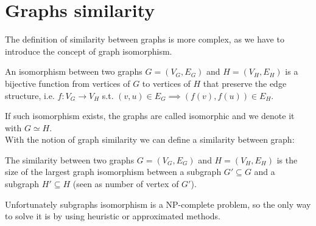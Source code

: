 \section{Graphs similarity}

The definition of similarity between graphs is more complex, as we have to introduce the concept of graph isomorphism.

\begin{definizione}
	An isomorphism between two graphs $G=(V_{G}, E_{G})$ and $H=(V_{H}, E_{H})$ is a bijective function from vertices of $G$ to vertices of $H$ that preserve the edge structure, i.e.  $f : V_{G} \rightarrow V_{H}$ s.t. $(v, u) \in E_{G} \implies (f(v), f(u)) \in E_{H}$.
\end{definizione}

If such isomorphism exists, the graphs are called isomorphic and we denote it with $G \simeq H$.\\ 

With the notion of graph similarity we can define a similarity between graph:

\begin{definizione}
	The similarity between two graphs $G=(V_{G}, E_{G})$ and $H=(V_{H}, E_{H})$ is the size of the largest graph isomorphism between a subgraph $G' \subseteq G$ and a subgraph $H' \subseteq H$ (seen as number of vertex of $G'$).
\end{definizione}

Unfortunately subgraphs isomorphism is a NP-complete problem, so the only way to solve it is by using heuristic or approximated methods.

